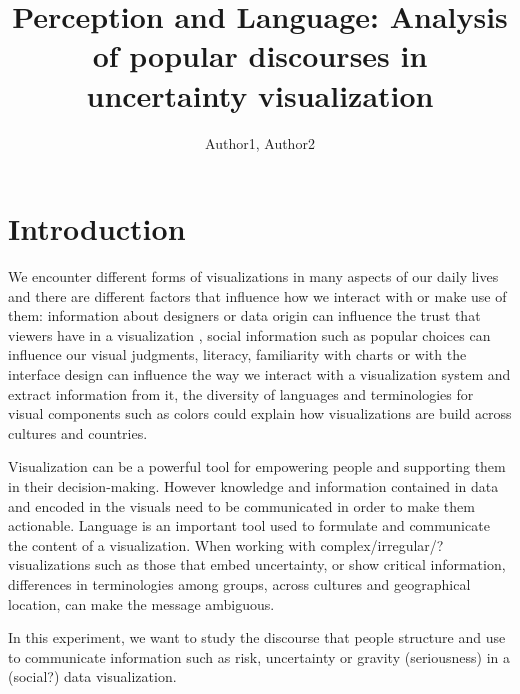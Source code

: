 \documentclass{proc}
\begin{document}
\title{Perception and Language: Analysis of popular discourses in uncertainty visualization}


\author{Author1, Author2}

\maketitle

\section{Introduction}

We encounter different forms of visualizations in many aspects of our daily lives and there are different factors that influence how we interact with or make use of them: information about designers or data origin can influence the trust that viewers have in a visualization \cite{peck2019data}, social information such as popular choices can influence our visual judgments\cite{hullman2011impact}, literacy, familiarity with charts or with the interface design \cite{blascheck2018exploration} can influence the way we interact with a visualization system and extract information from it, the diversity of languages and terminologies for visual components such as colors \cite{lindsey2009world} could explain how visualizations are build across cultures and countries. 

Visualization can be a powerful tool for empowering people and supporting them in their decision-making. However knowledge and information contained in data and encoded in the visuals need to be communicated in order to make them actionable. Language is an important tool used to formulate and communicate the content of a visualization. When working with complex/irregular/? visualizations such as those that embed uncertainty, or show critical information, differences in terminologies among groups, across cultures and geographical location, can make the message ambiguous. 
 
In this experiment, we want to study the discourse that people structure and use to communicate information such as risk, uncertainty or gravity (seriousness) in a (social?) data visualization. 
\end{document}
